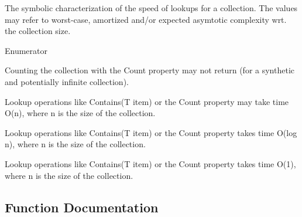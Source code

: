 The symbolic characterization of the speed of lookups for a collection. The values may refer to worst-\/case, amortized and/or expected asymtotic complexity wrt. the collection size. 

\begin{Desc}
\item[Enumerator]\par
\begin{description}
\item[{\em 
\hypertarget{namespace_c5_a615ba88dcdaa8d5a3c5f833a73d7fad6a80e9b5be5249c2c27eba9e624804727b}{}Potentially\+Infinite\label{namespace_c5_a615ba88dcdaa8d5a3c5f833a73d7fad6a80e9b5be5249c2c27eba9e624804727b}
}]Counting the collection with the {\ttfamily Count property} may not return (for a synthetic and potentially infinite collection). \item[{\em 
\hypertarget{namespace_c5_a615ba88dcdaa8d5a3c5f833a73d7fad6a32a843da6ea40ab3b17a3421ccdf671b}{}Linear\label{namespace_c5_a615ba88dcdaa8d5a3c5f833a73d7fad6a32a843da6ea40ab3b17a3421ccdf671b}
}]Lookup operations like {\ttfamily Contains(\+T item)} or the {\ttfamily Count} property may take time O(n), where n is the size of the collection. \item[{\em 
\hypertarget{namespace_c5_a615ba88dcdaa8d5a3c5f833a73d7fad6ace0be71e33226e4c1db2bcea5959f16b}{}Log\label{namespace_c5_a615ba88dcdaa8d5a3c5f833a73d7fad6ace0be71e33226e4c1db2bcea5959f16b}
}]Lookup operations like {\ttfamily Contains(\+T item)} or the {\ttfamily Count} property takes time O(log n), where n is the size of the collection. \item[{\em 
\hypertarget{namespace_c5_a615ba88dcdaa8d5a3c5f833a73d7fad6acb17869fe51048b5a5c4c6106551a255}{}Constant\label{namespace_c5_a615ba88dcdaa8d5a3c5f833a73d7fad6acb17869fe51048b5a5c4c6106551a255}
}]Lookup operations like {\ttfamily Contains(\+T item)} or the {\ttfamily Count} property takes time O(1), where n is the size of the collection. \end{description}
\end{Desc}


\subsection{Function Documentation}
\hypertarget{namespace_c5_a1e765c361aac015d7c57a8d3c6cb57c8}{}
